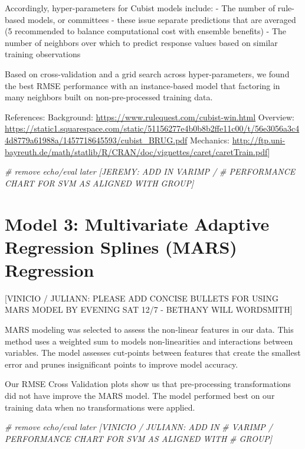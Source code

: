 \documentclass[]{report}
\newenvironment{Shaded}{\begin{snugshade}}{\end{snugshade}}
\newcommand{\CommentTok}[1]{\textcolor[rgb]{0.56,0.35,0.01}{\textit{#1}}}
\begin{document}
Accordingly, hyper-parameters for Cubist models include: - The number of
rule-based models, or committees - these issue separate predictions that
are averaged (5 recommended to balance computational cost with ensemble
benefits) - The number of neighbors over which to predict response
values based on similar training observations

Based on cross-validation and a grid search across hyper-parameters, we
found the best RMSE performance with an instance-based model that
factoring in many neighbors built on non-pre-processed training data.

References: Background: \url{https://www.rulequest.com/cubist-win.html}
Overview:
\url{https://static1.squarespace.com/static/51156277e4b0b8b2ffe11c00/t/56e3056a3c44d8779a61988a/1457718645593/cubist_BRUG.pdf}
Mechanics:
\url{http://ftp.uni-bayreuth.de/math/statlib/R/CRAN/doc/vignettes/caret/caretTrain.pdf}{]}

\begin{Shaded}
\begin{Highlighting}[]
\CommentTok{# remove echo/eval later [JEREMY: ADD IN VARIMP /}
\CommentTok{# PERFORMANCE CHART FOR SVM AS ALIGNED WITH GROUP]}
\end{Highlighting}
\end{Shaded}

\hypertarget{model-3-multivariate-adaptive-regression-splines-mars-regression}{%
\section{Model 3: Multivariate Adaptive Regression Splines (MARS)
Regression}\label{model-3-multivariate-adaptive-regression-splines-mars-regression}}

{[}VINICIO / JULIANN: PLEASE ADD CONCISE BULLETS FOR USING MARS MODEL BY
EVENING SAT 12/7 - BETHANY WILL WORDSMITH{]}

MARS modeling was selected to assess the non-linear features in our
data. This method uses a weighted sum to models non-linearities and
interactions between variables. The model assesses cut-points between
features that create the smallest error and prunes insignificant points
to improve model accuracy.

Our RMSE Cross Validation plots show us that pre-processing
transformations did not have improve the MARS model. The model performed
best on our training data when no transformations were applied.

\begin{Shaded}
\begin{Highlighting}[]
\CommentTok{# remove echo/eval later [VINICIO / JULIANN: ADD IN}
\CommentTok{# VARIMP / PERFORMANCE CHART FOR SVM AS ALIGNED WITH}
\CommentTok{# GROUP]}
\end{Highlighting}
\end{Shaded}
\end{document}

